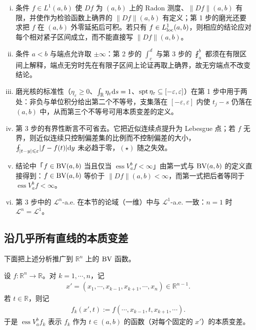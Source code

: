 \documentclass[../../main.tex]{subfiles}%
\begin{document}
\begin{remark}\label{remark:ch05-thm-5-21-条件}
\begin{enumerate}[(i)]
\item 条件 $f\in L^1(a,b)$ 使 $Df$ 为 $(a,b)$ 上的 Radon 测度、$\lVert Df\rVert(a,b)$ 有限，并使作为检验函数上确界的 $\lVert Df\rVert(a,b)$ 有定义；第 1 步的磨光还要求把 $f$ 在 $(a,b)$ 外零延拓后可积。若只有 $f\in L^1_{\mathrm{loc}}(a,b)$，则相应的结论应对每个相对紧子区间成立，而不能直接写 $\lVert Df\rVert(a,b)$。%
\item 条件 $a<b$ 与端点允许取 $\pm\infty$：第 2 步的 $\int_c^d$ 与第 3 步的 $\fint_a^b$ 都须在有限区间上解释，端点无穷时先在有限子区间上论证再取上确界，故无穷端点不改变结论。
\item 磨光核的标准性（$\eta_\varepsilon\geqslant0$、$\int_{\mathbb{R}}\eta_\varepsilon\mathrm{d} s=1$、$\operatorname{spt}\eta_\varepsilon\subseteq[-\varepsilon,\varepsilon]$）在第 1 步中用于两处：非负与单位积分给出第二个不等号，支集落在 $[-\varepsilon,\varepsilon]$ 内使 $t_j-s$ 仍落在 $(a,b)$ 中，从而第三个不等号可用本质变差的定义。
\item 第 3 步的有界性断言不可省去。它把近似连续点提升为 Lebesgue 点；若 $f$ 无界，则近似连续只控制偏差集的比例而不控制偏差的大小，$\fint_{\lvert t-y\rvert\leqslant\varepsilon}\lvert f-f(t)\rvert\diff y$ 未必趋于零，$(\star)$ 随之失效。
\item 结论中「$f\in\mathrm{BV}(a,b)$ 当且仅当 $\operatorname{ess}V_a^b f<\infty$」由第一式与 $\mathrm{BV}(a,b)$ 的定义直接得到：$f\in\mathrm{BV}(a,b)$ 等价于 $\lVert Df\rVert(a,b)<\infty$，而第一式把后者等同于 $\operatorname{ess}V_a^b f<\infty$。
\item 第 3 步中的 $\mathcal{L}^n$-a.e. 在本节的论域（一维）中与 $\mathcal{L}^1$-a.e. 一致：$n=1$ 时 $\mathcal{L}^n=\mathcal{L}^1$。
\end{enumerate}
\end{remark}

\subsection{沿几乎所有直线的本质变差}\label{subsection:ch05-10-2}

下面把上述分析推广到 $\mathbb{R}^n$ 上的 $\mathrm{BV}$ 函数。

\begin{remark}\label{remark:ch05-thm-5-21-记号}
设 $f:\mathbb{R}^n\to\mathbb{R}$。对 $k=1,\cdots,n$，记
\begin{align*}
x'=(x_1,\cdots,x_{k-1},x_{k+1},\cdots,x_n)\in\mathbb{R}^{n-1}.
\end{align*}
若 $t\in\mathbb{R}$，则记
\begin{align*}
f_k(x',t):=f(\cdots,x_{k-1},t,x_{k+1},\cdots).
\end{align*}
于是 $\operatorname{ess}V_a^b f_k$ 表示 $f_k$ 作为 $t\in(a,b)$ 的函数（对每个固定的 $x'$）的本质变差。
\end{remark}
\end{document}
